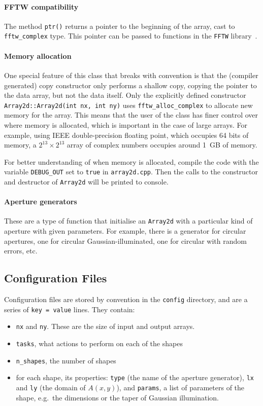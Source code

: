 \documentclass{article}
\begin{document}
\paragraph{FFTW compatibility} The method \texttt{ptr()} returns a pointer to the beginning of the array, cast to \texttt{fftw\_complex} type. This pointer can be passed to functions in the \texttt{FFTW} library~\cite[Section 4]{fftw}.

\paragraph{Memory allocation} One special feature of this class that breaks with convention is that the (compiler generated) copy constructor only performs a shallow copy, copying the pointer to the data array, but not the data itself. Only the explicitly defined constructor \texttt{Array2d::Array2d(int nx, int ny)} uses \texttt{fftw\_alloc\_complex} to allocate new memory for the array. This means that the user of the class has finer control over where memory is allocated, which is important in the case of large arrays. For example, using IEEE double-precision floating point, which occupies 64 bits of memory, a $2^{13} \times 2^{13}$ array of complex numbers occupies around \SI{1}{GB} of memory.

For better understanding of when memory is allocated, compile the code with the variable \texttt{DEBUG\_OUT} set to \texttt{true} in \texttt{array2d.cpp}. Then the calls to the constructor and destructor of \texttt{Array2d} will be printed to console.

\paragraph{Aperture generators} These are a type of function that initialise an \texttt{Array2d} with a particular kind of aperture with given parameters. For example, there is a generator for circular apertures, one for circular Gaussian-illuminated, one for circular with random errors, etc.

\subsection{Configuration Files}
Configuration files are stored by convention in the \texttt{config} directory, and are a series of \texttt{key = value} lines. They contain:
\begin{itemize}
    \item \texttt{nx} and \texttt{ny}. These are the size of input and output arrays.
    \item \texttt{tasks}, what actions to perform on each of the shapes
    \item \texttt{n\_shapes}, the number of shapes
    \item for each shape, its properties: \texttt{type} (the name of the aperture generator), \texttt{lx} and \texttt{ly} (the domain of $A(x,y)$), and \texttt{params}, a list of parameters of the shape, e.g.\ the dimensions or the taper of Gaussian illumination.
\end{itemize}
\end{document}

